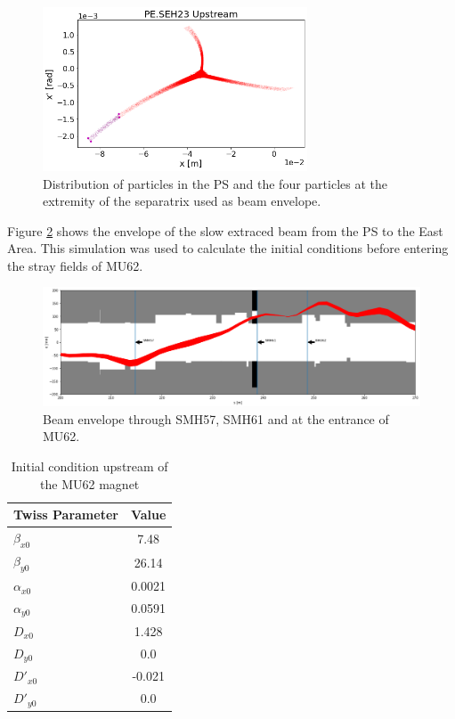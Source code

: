 \begin{figure}[H]
\centering
\includegraphics[width=0.7\textwidth]{02_Simulation/images/init_pycollimate.png}
\caption{Distribution of particles in the PS and the four particles at the extremity of the separatrix used as beam envelope.}
\label{fig:init_pycollimate}
\end{figure}

Figure \ref{fig:beam_envelope} shows the envelope of the slow extraced beam from the PS to the East Area. This simulation was used to calculate the initial conditions before entering the stray fields of MU62.


\begin{figure}[H]
\centering
\includegraphics[width=1.0\textwidth]{02_Simulation/images/beam_envelope.png}
\caption{Beam envelope through SMH57, SMH61 and at the entrance of MU62.}
\label{fig:beam_envelope}
\end{figure}

\begin{table}[ht]
    \centering
    \caption{Initial condition upstream of the MU62 magnet}
    \begin{tabular}{l c}
        \hline
        \textbf{Twiss Parameter} & \textbf{Value} \\
        \hline
        $\beta_{x0}$ & 7.48 \\
        $\beta_{y0}$ & 26.14 \\
        $\alpha_{x0}$ & 0.0021 \\
        $\alpha_{y0}$ & 0.0591 \\
        $D_{x0}$ & 1.428 \\
        $D_{y0}$ & 0.0 \\
        $D'_{x0}$ & -0.021 \\
        $D'_{y0}$ & 0.0 \\
        \hline
    \end{tabular}
    \label{tab:twiss_parameters}
\end{table}


